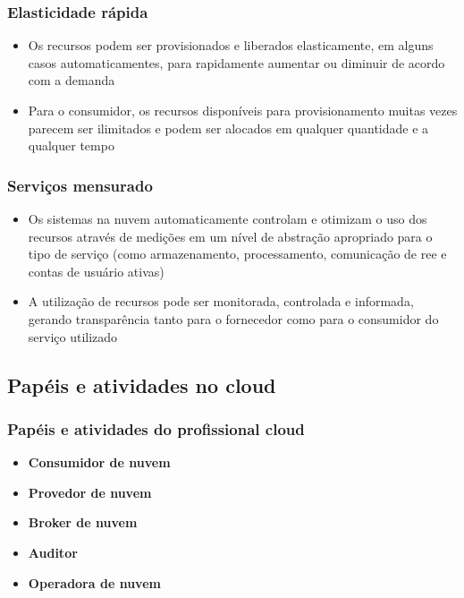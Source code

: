 \begin{frame}
	\frametitle{Elasticidade rápida}
	\begin{itemize}
		\item Os recursos podem ser provisionados e liberados elasticamente, em alguns casos automaticamentes, para rapidamente aumentar ou diminuir de acordo com a demanda
		\item Para o consumidor, os recursos disponíveis para provisionamento muitas vezes parecem ser ilimitados e podem ser alocados em qualquer quantidade e a qualquer tempo
	\end{itemize}
\end{frame}

\begin{frame}
	\frametitle{Serviços mensurado}
	\begin{itemize}
		\item Os sistemas na nuvem automaticamente controlam e otimizam o uso dos recursos através de medições em um nível de abstração apropriado para o tipo de serviço (como armazenamento, processamento, comunicação de ree e contas de usuário ativas)
		\item A utilização de recursos pode ser monitorada, controlada e informada, gerando transparência tanto para o fornecedor como para o consumidor do serviço utilizado
	\end{itemize}
\end{frame}

\subsection{Papéis e atividades no cloud}

\begin{frame}
	\frametitle{Papéis e atividades do profissional cloud}
	\begin{itemize}
		\item \textbf{Consumidor de nuvem}
		\item \textbf{Provedor de nuvem}
		\item \textbf{Broker de nuvem}
		\item \textbf{Auditor}
		\item \textbf{Operadora de nuvem}
	\end{itemize}
\end{frame}

